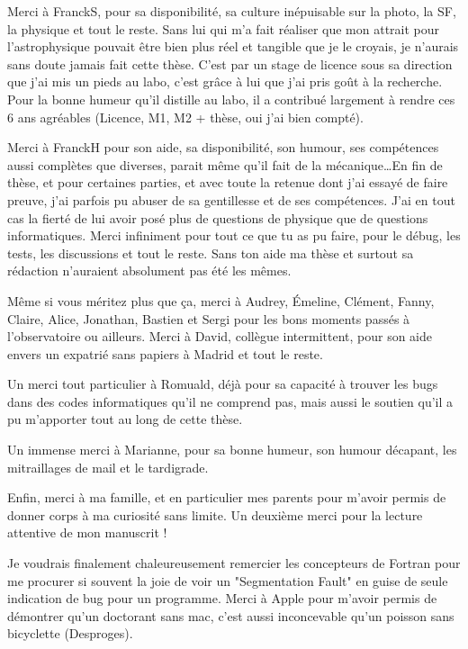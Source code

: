 \bigskip

Merci à FranckS, pour sa disponibilité, sa culture inépuisable sur la photo, la SF, la physique et tout le reste. Sans lui qui
m'a fait réaliser que mon attrait pour l'astrophysique pouvait être bien plus réel et tangible que je le croyais, je n'aurais
sans doute jamais fait cette thèse. C'est par un stage de licence sous sa direction que j'ai mis un pieds au labo, c'est grâce à
lui que j'ai pris goût à la recherche. Pour la bonne humeur qu'il distille au labo, il a contribué largement à rendre ces 6 ans
agréables (Licence, M1, M2 + thèse, oui j'ai bien compté).

Merci à FranckH pour son aide, sa disponibilité, son humour, ses compétences aussi complètes que diverses, parait même qu'il
fait de la mécanique\dots En fin de thèse, et pour certaines parties, et avec toute la retenue dont j'ai essayé de faire preuve,
j'ai parfois pu abuser de sa gentillesse et de ses compétences. J'ai en tout cas la fierté de lui avoir posé plus de questions
de physique que de questions informatiques. Merci infiniment pour tout ce que tu as pu faire, pour le débug, les tests, les
discussions et tout le reste. Sans ton aide ma thèse et surtout sa rédaction n'auraient absolument pas été les mêmes. 

\bigskip

Même si vous méritez plus que ça, merci à Audrey, Émeline, Clément, Fanny, Claire,
Alice, Jonathan, Bastien et
Sergi pour les bons moments passés à l'observatoire ou ailleurs. Merci à David, collègue intermittent, pour son 
aide envers un expatrié sans papiers à Madrid et tout le reste.

Un merci tout particulier à Romuald, déjà pour sa capacité à trouver les bugs dans des codes informatiques qu'il ne comprend
pas, mais aussi le soutien qu'il a pu m'apporter tout au long de cette thèse. 

Un immense merci à Marianne, pour sa bonne humeur, son humour décapant, les mitraillages de mail et le tardigrade. 

Enfin, merci à ma famille, et en particulier mes parents pour m'avoir permis de donner corps à ma curiosité sans limite. Un deuxième merci pour la lecture attentive de mon manuscrit !

Je voudrais finalement chaleureusement remercier les
concepteurs de Fortran pour me procurer si souvent la joie de voir un "Segmentation Fault" en guise de seule indication de bug
pour un programme. Merci à Apple pour m'avoir permis de démontrer qu'un doctorant sans mac, c'est aussi inconcevable qu'un
poisson sans bicyclette (\textcopyright Desproges). 

